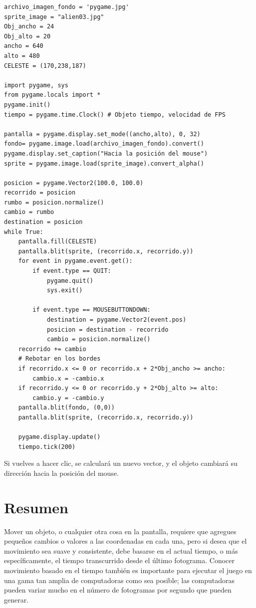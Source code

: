 {\hspace{-2.4cm}{\ttfamily \scriptsize hacia\_el}

\vspace{-0.2cm}
\hspace{-2.4cm}{\ttfamily \scriptsize mouse.py}\vspace{-0.84cm}
\begin{lstlisting}		
archivo_imagen_fondo = 'pygame.jpg'
sprite_image = "alien03.jpg"
Obj_ancho = 24
Obj_alto = 20
ancho = 640
alto = 480
CELESTE = (170,238,187)

import pygame, sys
from pygame.locals import *
pygame.init()
tiempo = pygame.time.Clock() # Objeto tiempo, velocidad de FPS

pantalla = pygame.display.set_mode((ancho,alto), 0, 32)
fondo= pygame.image.load(archivo_imagen_fondo).convert()
pygame.display.set_caption("Hacia la posición del mouse")
sprite = pygame.image.load(sprite_image).convert_alpha()

posicion = pygame.Vector2(100.0, 100.0)
recorrido = posicion
rumbo = posicion.normalize()
cambio = rumbo
destination = posicion
while True:
    pantalla.fill(CELESTE)
    pantalla.blit(sprite, (recorrido.x, recorrido.y)) 
    for event in pygame.event.get():
        if event.type == QUIT:
            pygame.quit()
            sys.exit()

        if event.type == MOUSEBUTTONDOWN:             
            destination = pygame.Vector2(event.pos)           
            posicion = destination - recorrido 
            cambio = posicion.normalize()
    recorrido += cambio
    # Rebotar en los bordes
    if recorrido.x <= 0 or recorrido.x + 2*Obj_ancho >= ancho:
        cambio.x = -cambio.x       
    if recorrido.y <= 0 or recorrido.y + 2*Obj_alto >= alto:
        cambio.y = -cambio.y
    pantalla.blit(fondo, (0,0)) 
    pantalla.blit(sprite, (recorrido.x, recorrido.y))  

    pygame.display.update()
    tiempo.tick(200)
\end{lstlisting}
Si vuelves a hacer clic, se calculará un nuevo vector, y el objeto cambiará su dirección hacia la posición del mouse. 


\section{Resumen}

Mover un objeto, o cualquier otra cosa en la pantalla, requiere que agregues pequeños cambios o valores a las coordenadas en cada una, pero si desea que el movimiento sea suave y consistente, debe basarse en el actual tiempo, o más específicamente, el tiempo transcurrido desde el último fotograma. Conocer  movimiento basado en el tiempo también es importante para ejecutar el juego en una gama tan amplia de computadoras como sea posible; las computadoras pueden variar mucho en el número de fotogramas por segundo que pueden generar.

}
